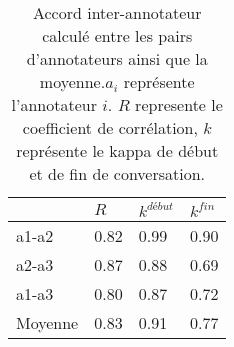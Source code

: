 \begin{table}[th]
    \centering
    \begin{tabular}{| p{1cm} | l | l l |}
    \hline
      & $R$ & $k^{début}$ &$k^{fin}$  \\
      \hline
      a1-a2   &0.82   &0.99   &0.90   \\
      a2-a3   &0.87   &0.88   &0.69   \\
      a1-a3   &0.80   &0.87   &0.72   \\
      \hline
      Moyenne &0.83   &0.91   &0.77   \\
      \hline
    \end{tabular}
    \caption{Accord inter-annotateur calculé entre les pairs d'annotateurs ainsi que la moyenne.$a_i$ représente l'annotateur $i$. $R$ represente le coefficient de corrélation, $k$ représente le kappa de début et de fin de conversation.}
    \label{tab:accordInterAnnot}
  \end{table}
